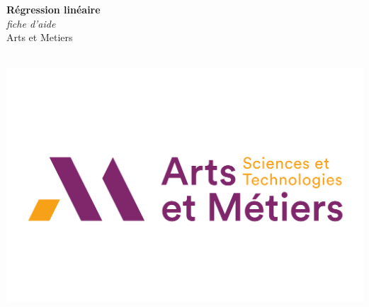 \documentclass[a0,portrait]{a0poster}
\begin{document}


\begin{minipage}[b]{0.75\linewidth}
\veryHuge \color{NavyBlue} \textbf{Régression linéaire} \color{Black}\\ %
\Huge\textit{fiche d'aide}\\[2cm] %
\huge Arts et Metiers\\[0.4cm] %
\\
\end{minipage}
%
\begin{minipage}[b]{0.25\linewidth}
\includegraphics[width=20cm]{logo.png}\\
\end{minipage}

\vspace{1cm} %


\end{document}
